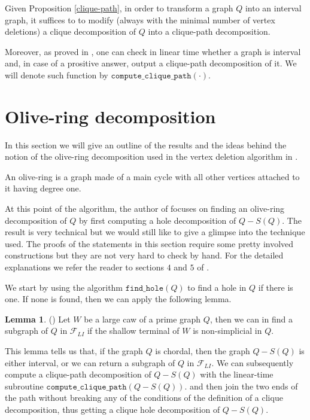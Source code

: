 \documentclass{article}
\theoremstyle{definition}
\newtheorem{lemma}[thm]{Lemma}
\begin{document}
    Given Proposition \ref{clique-path},
    in order to transform
    a graph $Q$ into an
    interval graph, it suffices
    to to modify
    (always with the minimal
    number of vertex deletions)
    a clique decomposition of
    $Q$ into a clique-path decomposition.
    
    Moreover, as proved in \cite{inter-path},
    one can check in linear time whether
    a graph is interval and, in case of 
    a prositive answer, output
    a clique-path decomposition of it.
    We will denote such function by
    $\texttt{compute\_clique\_path}\left(\cdot\right)$.

    \section{Olive-ring decomposition}

    In this section we will give
    an outline of the results 
    and the ideas behind the 
    notion of the olive-ring
    decomposition used in the
    vertex deletion algorithm
    in \cite{main}.

    An olive-ring is a
    graph made of a main cycle
    with all other vertices
    attached to it having 
    degree one.

    At this point of 
    the algorithm,
    the author of \cite{main} focuses
    on finding an olive-ring
    decomposition of $Q$
    by first computing
    a hole
    decomposition of $Q - S\left(Q\right)$.
    The result is very technical
    but we would still like
    to give a glimpse into
    the technique used.
    The proofs of the
    statements in this
    section require
    some pretty
    involved constructions
    but they are not
    very hard to check
    by hand.
    For the detailed
    explanations we
    refer the reader to
    sections $4$ and $5$ 
    of \cite{main}.
    
    We start by using the
    algorithm $\texttt{find\_hole}\left(Q\right)$
    to find a hole in $Q$ if
    there is one.
    If none is found, then we
    can apply the following lemma.

    \begin{lemma} (\cite{main}) \label{large caw lemma}
        Let $W$ be a large caw
        of a prime graph $Q$, 
        then we can in find
        a subgraph of $Q$ 
        in $\mathcal{F}_{LI}$ 
        if the shallow terminal of $W$
        is non-simplicial in $Q$.
    \end{lemma}

    This lemma tells us 
    that, if the graph $Q$
    is chordal, then
    the graph $Q - S\left(Q\right)$ 
    is either interval,
    or we can return a
    subgraph of $Q$ in $\mathcal{F}_{LI}$.
    We can subsequently
    compute a clique-path 
    decomposition of $Q - S\left(Q\right)$ 
    with the linear-time
    subroutine $\texttt{compute\_clique\_path}\left(Q - S\left(Q\right)\right)$.
    and then join the two ends
    of the path without
    breaking any of the 
    conditions of
    the definition
    of a clique decomposition,
    thus getting a
    clique hole decomposition
    of $Q - S\left(Q\right)$.
   
\end{document}
